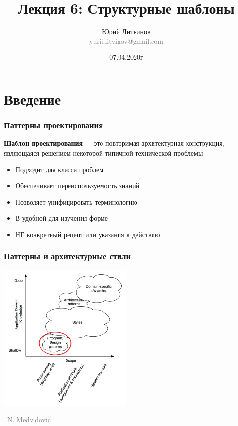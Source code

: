 \documentclass[xetex,mathserif,serif]{beamer}
\title[Структурные шаблоны]{Лекция 6: Структурные шаблоны}
\author[Юрий Литвинов]{Юрий Литвинов\\\small{\textcolor{gray}{yurii.litvinov@gmail.com}}}
\date{07.04.2020г}
\newcommand{\attribution}[1] {
	\vspace{-5mm}\begin{flushright}\begin{scriptsize}\textcolor{gray}{\textcopyright\, #1}\end{scriptsize}\end{flushright}
}
\begin{document}
	\frame{\titlepage}

	\section{Введение}

	\begin{frame}
		\frametitle{Паттерны проектирования}
		\textbf{Шаблон проектирования} --- это повторимая архитектурная конструкция, являющаяся решением некоторой типичной технической проблемы
		\begin{itemize}
			\item Подходит для класса проблем
			\item Обеспечивает переиспользуемость знаний
			\item Позволяет унифицировать терминологию
			\item В удобной для изучения форме
			\item НЕ конкретный рецепт или указания к действию
		\end{itemize}
	\end{frame}

	\begin{frame}
		\frametitle{Паттерны и архитектурные стили}
		\begin{center}
			\includegraphics[width=0.5\textwidth]{architecturalStylesPatternsHighlighted.png}
			\attribution{N. Medvidovic}
		\end{center}
	\end{frame}
\end{document}
